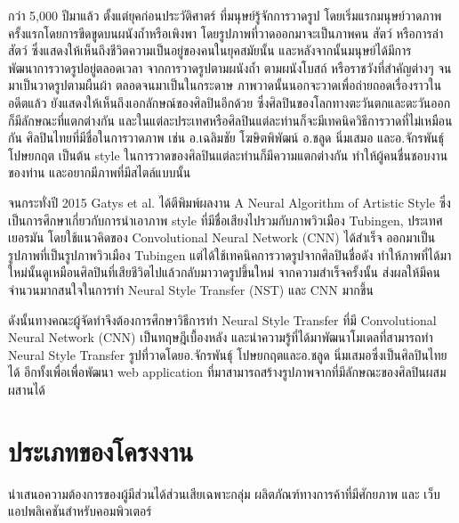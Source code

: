 \documentclass[12pt,oneside,openright,a4paper]{cpe-thai-project}
\begin{document}
\par\setlength{\parindent}{5ex}กว่า 5,000 ปีมาแล้ว ตั้งแต่ยุคก่อนประวัติศาตร์ ที่มนุษย์รู้จักการวาดรูป โดยเริ่มแรกมนุษย์วาดภาพครั้งแรกโดยการขีดขูดบนผนังถ้ำหรือเพิงพา โดยรูปภาพที่วาดออกมาจะเป็นภาพคน สัตว์ หรือการล่าสัตว์ ซึ่งแสดงให้เห็นถึงชีวิตความเป็นอยู่ของคนในยุคสมัยนั้น และหลังจากนั้นมนุษย์ได้มีการพัฒนาการวาดรูปอยู่ตลอดเวลา จากการวาดรูปตามผนังถ้ำ ตามผนังโบสถ์ หรือราชวังที่สำคัญต่างๆ จนมาเป็นวาดรูปตามผืนผ้า ตลอดจนมาเป็นในกระดาษ ภาพวาดนั้นนอกจะวาดเพื่อถ่ายถอดเรื่องราวในอดีตแล้ว ยังแสดงให้เห็นถึงเอกลักษณ์ของศิลปินอีกด้วย ซึ่งศิลปินของโลกทางตะวันตกและตะวันออกก็มีลักษณะที่แตกต่างกัน และในแต่ละประเทศหรือศิลปินแต่ละท่านก็จะมีเทคนิควิธีการวาดที่ไม่เหมือนกัน ศิลปินไทยที่มีชื่อในการวาดภาพ เช่น อ.เฉลิมชัย โฆษิตพิพัฒน์ อ.ชลูด นิ่มเสมอ และอ.จักรพันธุ์ โปษยกฤต เป็นต้น style ในการวาดของศิลปินแต่ละท่านก็มีความแตกต่างกัน ทำให้ผู้คนชื่นชอบงานของท่าน และอยากมีภาพที่มีสไตล์แบบนั้น 
\par\setlength{\parindent}{5ex}จนกระทั่งปี 2015 Gatys et al. ได้ตีพิมพ์ผลงาน A Neural Algorithm of Artistic Style ซึ่งเป็นการศึกษาเกี่ยวกับการนำเอาภาพ style ที่มีชื่อเสียงไปรวมกับภาพวิวเมือง Tubingen, ประเทศเยอรมัน โดยใช้แนวคิดของ Convolutional Neural Network (CNN)  ได้สำเร็จ ออกมาเป็นรูปภาพที่เป็นรูปภาพวิวเมือง Tubingen แต่ได้ใช้เทคนิคการวาดรูปจากศิลปินชื่อดัง ทำให้ภาพที่ได้มาใหม่นั้นดูเหมือนศิลปินที่เสียชีวิตไปแล้วกลับมาวาดรูปขึ้นใหม่ จากความสำเร็จครั้งนั้น ส่งผลให้มีคนจำนวนมากสนใจในการทำ Neural Style Transfer (NST) และ CNN มากขึ้น
\par\setlength{\parindent}{5ex}ดังนั้นทางคณะผู้จัดทำจึงต้องการศึกษาวิธีการทำ Neural Style Transfer ที่มี Convolutional Neural Network (CNN) เป็นทฤษฎีเบื้องหลัง และนำความรู้ที่ได้มาพัฒนาโมเดลที่สามารถทำ Neural Style Transfer รูปที่วาดโดยอ.จักรพันธุ์ โปษยกฤตและอ.ชลูด นิ่มเสมอซึ่งเป็นศิลปินไทยได้ อีกทั้งเพื่อเพื่อพัฒนา web application ที่มาสามารถสร้างรูปภาพจากที่มีลักษณะของศิลปินผสมผสานได้

\section{ประเภทของโครงงาน}
\par\setlength{\parindent}{5ex}นําเสนอความต้องการของผู้มีส่วนได้ส่วนเสียเฉพาะกลุ่ม ผลิตภัณฑ์ทางการค้าที่มีศักยภาพ และ เว็บแอปพลิเคชันสำหรับคอมพิวเตอร์
\end{document}
